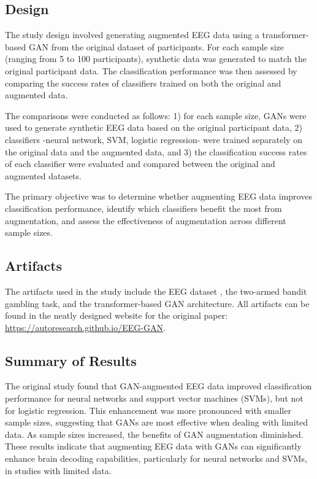 \documentclass[10pt,letterpaper]{article}
\begin{document}
\subsection{Design}
The study design involved generating augmented EEG data using a transformer-based GAN \cite{gan} from the original dataset of participants. For each sample size (ranging from 5 to 100 participants), synthetic data was generated to match the original participant data. The classification performance was then assessed by comparing the success rates of classifiers trained on both the original and augmented data.

The comparisons were conducted as follows: 1) for each sample size, GANs were used to generate synthetic EEG data based on the original participant data,
2) classifiers -neural network, SVM, logistic regression- were trained separately on the original data and the augmented data, and 3) the classification success rates of each classifier were evaluated and compared between the original and augmented datasets.

The primary objective was to determine whether augmenting EEG data improves classification performance, identify which classifiers benefit the most from augmentation, and assess the effectiveness of augmentation across different sample sizes.

\subsection{Artifacts}
The artifacts used in the study include the EEG dataset \cite{originaldataset}, the two-armed bandit gambling task, and the transformer-based GAN architecture. All artifacts can be found in the neatly designed website for the original paper: \url{https://autoresearch.github.io/EEG-GAN}.

\subsection{Summary of Results} 

The original study found that GAN-augmented EEG data improved classification performance for neural networks and support vector machines (SVMs), but not for logistic regression. This enhancement was more pronounced with smaller sample sizes, suggesting that GANs are most effective when dealing with limited data. As sample sizes increased, the benefits of GAN augmentation diminished. These results indicate that augmenting EEG data with GANs can significantly enhance brain decoding capabilities, particularly for neural networks and SVMs, in studies with limited data.
\end{document}
